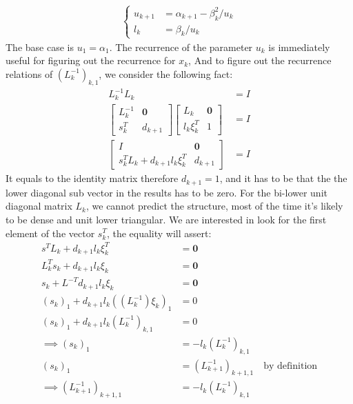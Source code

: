 \documentclass[]{article}
\theoremstyle{definition}
\begin{document}
            \begin{align}
                \begin{cases}
                    u_{k + 1} &= \alpha_{k + 1} - \beta_k^2/u_k
                    \\
                    l_k &= \beta_k/u_k
                \end{cases}
            \end{align}
            The base case is $u_1 = \alpha_1$. The recurrence of the parameter $u_k$ is immediately useful for figuring out the recurrence for $x_k$, And to figure out the recurrence relations of $(L^{-1}_k)_{k, 1}$, we consider the following fact: 
            \begin{align}
                L^{-1}_k L_k &= I 
                \\
                \begin{bmatrix}
                    L^{-1}_k & \mathbf{0} \\
                    s_k^T & d_{k + 1}
                \end{bmatrix}
                \begin{bmatrix}
                    L_k & \mathbf{0} \\
                    l_k \xi_k^T & 1
                \end{bmatrix} &= I
                \\
                \begin{bmatrix}
                    I & \mathbf{0} \\ 
                    s_k^TL_k + d_{k + 1}l_k \xi_k^T &d_{k + 1}
                \end{bmatrix} &= I
            \end{align}
            It equals to the identity matrix therefore $d_{k + 1} = 1$, and it has to be that the the lower diagonal sub vector in the results has to be zero. For the bi-lower unit diagonal matrix $L_k$, we cannot predict the structure, most of the time it's likely to be dense and unit lower  triangular. We are interested in look for the first element of the vector $s_k^T$, the equality will assert: 
            \begin{align}
                s^TL_k + d_{k + 1}l_k \xi_k^T &= \mathbf{0}
                \\
                L_k^{T}s_k + d_{k + 1}l_k \xi_k &= \mathbf{0}
                \\
                s_k + L^{-T} d_{k + 1}l_k \xi_k &= \mathbf{0}
                \\
                (s_k)_1 + d_{k + 1}l_k ((L^{-1}_k)\xi_k)_1 &= 0
                \\
                (s_k)_1 + d_{k + 1}l_k(L^{-1}_k)_{k , 1} &= 0
                \\\implies
                (s_k)_1 &= - l_k(L^{-1}_k)_{k, 1} 
                \\
                (s_k)_1 &= (L^{-1}_{k + 1})_{k + 1, 1}  \quad \text{by definition}
                \\
                \implies
                (L^{-1}_{k + 1})_{k + 1, 1} &=
                -l_k(L^{-1}_k)_{k, 1}
            \end{align}
\end{document}
